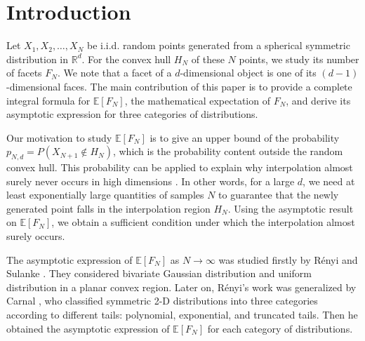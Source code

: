 \documentclass{aptpub}
\def\E{\mathbb{E}}
\begin{document}
\section{Introduction} %


Let $X_1, X_2, \dots, X_N$ be i.i.d. random points generated from
a spherical symmetric distribution in $\mathbb{R}^d$.
For the convex hull $H_N$ of these $N$ points, we study its number of facets $F_N$.
We note that a facet of a $d$-dimensional object is one of its $(d-1)$-dimensional faces.
The main contribution of this paper is to provide a complete integral formula for $\E[F_N]$,
the mathematical expectation
of $F_N$, and derive its asymptotic expression
for three categories of distributions.

Our motivation to study $\E[F_N]$
is to give an upper bound of
the probability $p_{N,d}=P(X_{N+1} \not\in H_N)$,
which is the probability content outside the random convex hull.
This probability can be applied to explain
why interpolation almost surely never occurs in high dimensions \cite{balestriero2021learning}.
In other words, for a large $d$, we need at least exponentially large quantities of samples $N$
to guarantee that the newly generated point falls in the interpolation region $H_N$.
Using the asymptotic result on $\E[F_N]$, we obtain
a sufficient condition under which the interpolation almost surely occurs.


The asymptotic expression of $\E[F_N]$ as $N\to \infty$
was studied firstly by R{\'e}nyi and Sulanke \cite{renyi1963konvexe}.
They considered
bivariate Gaussian distribution and uniform distribution
in a planar convex region.
Later on,  R{\'e}nyi's work was generalized by
Carnal \cite{carnal1970konvexe}, who
classified symmetric 2-D distributions
into three categories according to different tails:
polynomial, exponential, and truncated tails.
Then he obtained the asymptotic expression of $\E[F_N]$
for each category of distributions.
\end{document}
